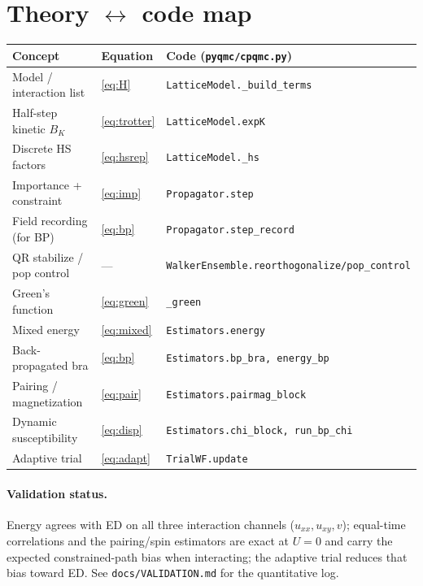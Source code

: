 \documentclass[11pt]{article}
\begin{document}
\section{Theory $\leftrightarrow$ code map}
\begin{center}
\begin{tabular}{lll}
\toprule
Concept & Equation & Code (\texttt{pyqmc/cpqmc.py})\\
\midrule
Model / interaction list & \eqref{eq:H} & \texttt{LatticeModel.\_build\_terms}\\
Half-step kinetic $B_K$ & \eqref{eq:trotter} & \texttt{LatticeModel.expK}\\
Discrete HS factors & \eqref{eq:hsrep} & \texttt{LatticeModel.\_hs}\\
Importance + constraint & \eqref{eq:imp} & \texttt{Propagator.step}\\
Field recording (for BP) & \eqref{eq:bp} & \texttt{Propagator.step\_record}\\
QR stabilize / pop control & --- & \texttt{WalkerEnsemble.reorthogonalize/pop\_control}\\
Green's function & \eqref{eq:green} & \texttt{\_green}\\
Mixed energy & \eqref{eq:mixed} & \texttt{Estimators.energy}\\
Back-propagated bra & \eqref{eq:bp} & \texttt{Estimators.bp\_bra,\ energy\_bp}\\
Pairing / magnetization & \eqref{eq:pair} & \texttt{Estimators.pairmag\_block}\\
Dynamic susceptibility & \eqref{eq:disp} & \texttt{Estimators.chi\_block,\ run\_bp\_chi}\\
Adaptive trial & \eqref{eq:adapt} & \texttt{TrialWF.update}\\
\bottomrule
\end{tabular}
\end{center}

\paragraph{Validation status.} Energy agrees with ED on all three interaction
channels ($u_{xx},u_{xy},v$); equal-time correlations and the pairing/spin
estimators are exact at $U=0$ and carry the expected constrained-path bias when
interacting; the adaptive trial reduces that bias toward ED. See
\texttt{docs/VALIDATION.md} for the quantitative log.
\end{document}

